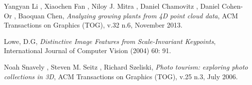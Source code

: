 \documentclass[a4paper]{article}
\begin{document}
\begin{thebibliography}{4}

 Yangyan Li , Xiaochen Fan , Niloy J. Mitra , Daniel Chamovitz , Daniel Cohen-Or , Baoquan Chen, \textit{Analyzing growing plants from 4D point cloud data}, ACM Transactions on Graphics (TOG), v.32 n.6, November 2013.

 Lowe, D.G, \textit{Distinctive Image Features from Scale-Invariant Keypoints}, International Journal of Computer Vision (2004) 60: 91.

 Noah Snavely , Steven M. Seitz , Richard Szeliski, \textit{Photo tourism: exploring photo collections in 3D}, ACM Transactions on Graphics (TOG), v.25 n.3, July 2006.


\end{thebibliography}
\end{document}
